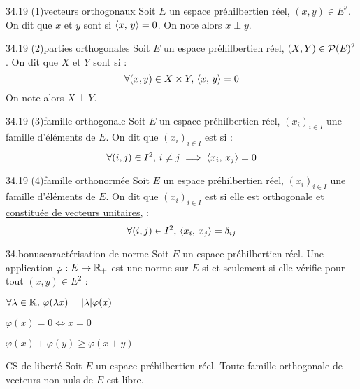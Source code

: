 \begin{adjustwidth}{-3cm}{-3cm}
\begin{definition}{34.19 (1)}{vecteurs orthogonaux}
    Soit $E$ un espace préhilbertien réel, $(x,y) \in E^2$.
    On dit que $x$ et $y$ sont  si $\left\langle x ,\, y \right\rangle = 0$. On note alors $x \perp y$.
\end{definition}

\begin{definition}{34.19 (2)}{parties orthogonales}
    Soit $E$ un espace préhilbertien réel, $(X,Y) \in \mathcal{P}(E)^2$.
    On dit que $X$ et $Y$ sont  si :
    $$\forall (x,y) \in X \times Y, \,\left\langle x ,\, y \right\rangle = 0$$
    On note alors $X \perp Y$.
\end{definition}

\begin{definition}{34.19 (3)}{famille orthogonale}
    Soit $E$ un espace préhilbertien réel, $(x_i)_{i \in I}$ une famille d'éléments de $E$.
    On dit que $(x_i)_{i \in I}$ est  si :
    $$\forall (i,j) \in I^2,\, i \neq j \implies \left\langle x_i ,\, x_j \right\rangle = 0$$
\end{definition}

\begin{definition}{34.19 (4)}{famille orthonormée}
    Soit $E$ un espace préhilbertien réel, $(x_i)_{i \in I}$ une famille d'éléments de $E$.
    On dit que $(x_i)_{i \in I}$ est  si elle est \underline{orthogonale} et \underline{constituée de vecteurs unitaires}, \ie :
    $$\forall (i,j) \in I^2, \,\left\langle x_i ,\, x_j \right\rangle = \delta_{ij}$$
\end{definition}

\begin{proposition}{34.bonus}{caractérisation de norme}
    Soit $E$ un espace préhilbertien réel. Une application $\varphi : E \to \mathbb{R}_+$ est une norme sur $E$ si et seulement si elle vérifie pour tout $(x,y) \in E^2$ :  
    \begin{enumeratebf}
        \item $\forall \lambda \in \mathbb{K},\, \varphi(\lambda x) = |\lambda| \varphi(x)$
        \item $\varphi(x) = 0 \Leftrightarrow x = 0$
        \item $\varphi(x) + \varphi(y) \geq \varphi(x + y)$
    \end{enumeratebf}
    
\end{proposition}

\begin{theoreme}{34.25}{CS de liberté}
    Soit $E$ un espace préhilbertien réel. Toute famille orthogonale de vecteurs non nuls de $E$ est libre.
\end{theoreme}


\end{adjustwidth}
